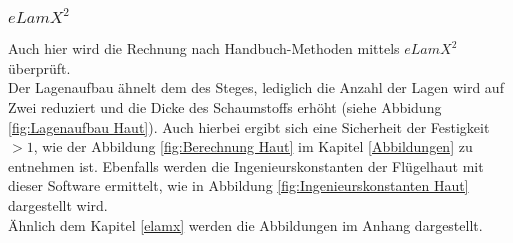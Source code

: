 \subsubsection{$eLamX^{2}$}

Auch hier wird die Rechnung nach Handbuch-Methoden mittels $eLamX^{2}$ überprüft. \\

\noindent Der Lagenaufbau ähnelt dem des Steges, lediglich die Anzahl der Lagen wird auf Zwei reduziert und die Dicke des Schaumstoffs erhöht (siehe Abbidung \ref{fig:Lagenaufbau Haut}). Auch hierbei ergibt sich eine Sicherheit der Festigkeit $>1$, wie der Abbildung \ref{fig:Berechnung Haut} im  Kapitel \ref{Abbildungen} zu entnehmen ist. Ebenfalls werden die Ingenieurskonstanten der Flügelhaut mit dieser Software ermittelt, wie in Abbildung \ref{fig:Ingenieurskonstanten Haut} dargestellt wird.\\

\noindent Ähnlich dem Kapitel \ref{elamx} werden die Abbildungen im Anhang dargestellt.